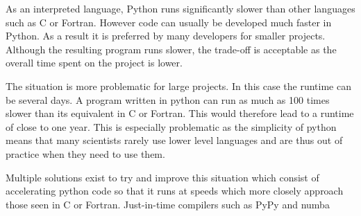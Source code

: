 
As an interpreted language, Python runs significantly slower than other languages such as C or Fortran. However code can usually be developed much faster in Python. As a result it is preferred by many developers for smaller projects. Although the resulting program runs slower, the trade-off is acceptable as the overall time spent on the project is lower.

The situation is more problematic for large projects. In this case the runtime can be several days. A program written in python can run as much as 100 times slower than its equivalent in C or Fortran. This would therefore lead to a runtime of close to one year. This is especially problematic as the simplicity of python means that many scientists rarely use lower level languages and are thus out of practice when they need to use them.

Multiple solutions exist to try and improve this situation which consist of accelerating python code so that it runs at speeds which more closely approach those seen in C or Fortran. Just-in-time compilers such as PyPy and numba 